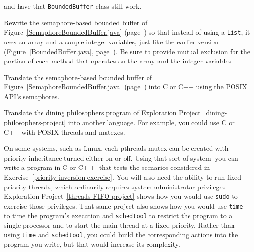 \begin{chapterEnumerate}
and have that \texttt{BoundedBuffer} class still work.
\item\label{semaphore-array-bb-project}
Rewrite the semaphore-based bounded buffer of
Figure~\ref{SemaphoreBoundedBuffer.java}
(page~\pageref{SemaphoreBoundedBuffer.java}) so that instead of using
a \verb|List|, it uses an array and a couple integer variables, just like the
earlier version (Figure~\ref{BoundedBuffer.java},
page~\pageref{BoundedBuffer.java}).  Be sure to provide mutual
exclusion for the portion of each method that operates on the array
and the integer variables.
\item
Translate the semaphore-based bounded buffer of
Figure~\ref{SemaphoreBoundedBuffer.java}
(page~\pageref{SemaphoreBoundedBuffer.java}) into C or C++ using the
POSIX API's semaphores.
\item
Translate the dining philosophers program of Exploration
Project~\ref{dining-philosophers-project} into another language.  For
example, you could use C or C++ with POSIX threads and mutexes.
\item\label{priority-inversion-project}
On some systems, such as Linux, each pthreads mutex can be created with priority inheritance turned either on or off.  Using that sort of system, you can write a program in C or C$++$ that tests the scenarios considered in Exercise~\ref{priority-inversion-exercise}.  You will also need the ability to run fixed-priority threads, which ordinarily requires system administrator privileges.  Exploration Project~\ref{threads-FIFO-project} shows how you would use \verb|sudo| to exercise those privileges.  That same project also shows how you would use \verb|time| to time the program's execution and \verb|schedtool| to restrict the program to a single processor and to start the main thread at a fixed priority.  Rather than using \verb|time| and \verb|schedtool|, you could build the corresponding actions into the program you write, but that would increase its complexity.


\end{chapterEnumerate}
